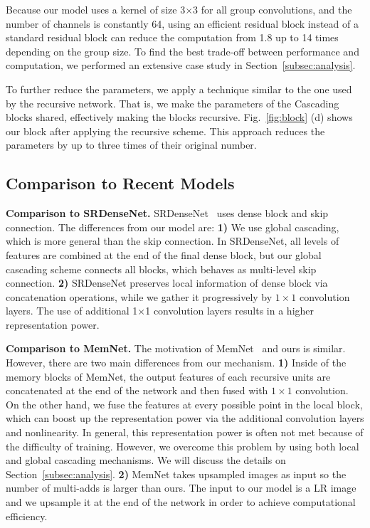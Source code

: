 \documentclass[runningheads]{llncs}
\begin{document}
Because our model uses a kernel of size 3$\times$3 for all group convolutions, and the number of channels is constantly 64, using an efficient residual block instead of a standard residual block can reduce the computation from 1.8 up to 14 times depending on the group size. To find the best trade-off between performance and computation, we performed an extensive case study in Section~\ref{subsec:analysis}.

To further reduce the parameters, we apply a technique similar to the one used by the recursive network. That is, we make the parameters of the Cascading blocks shared, effectively making the blocks recursive. Fig.~\ref{fig:block}  (d) shows our block after applying the recursive scheme. This approach reduces the parameters by up to three times of their original number.

\subsection{Comparison to Recent Models}
\textbf{Comparison to SRDenseNet.} SRDenseNet~\cite{srdense} uses dense block and skip connection. The differences from our model are: \textbf{1)} We use global cascading, which is more general than the skip connection. In SRDenseNet, all levels of features are combined at the end of the final dense block, but our global cascading scheme connects all blocks, which behaves as multi-level skip connection. \textbf{2)} SRDenseNet preserves local information of dense block via concatenation operations, while we gather it progressively by $1\times1$ convolution layers. The use of additional 1$\times$1 convolution layers results in a higher representation power.

\noindent\textbf{Comparison to MemNet.} The motivation of MemNet~\cite{memnet} and ours is similar. However, there are two main differences from our mechanism. \textbf{1)} Inside of the memory blocks of MemNet, the output features of each recursive units are concatenated at the end of the network and then fused with $1\times1$ convolution. On the other hand, we fuse the features at every possible point in the local block, which can boost up the representation power via the additional convolution layers and nonlinearity. In general, this representation power is often not met because of the difficulty of training. However, we overcome this problem by using both local and global cascading mechanisms. We will discuss the details on Section~\ref{subsec:analysis}.
\textbf{2)} MemNet takes upsampled images as input so the number of multi-adds is larger than ours. The input to our model is a LR image and we upsample it at the end of the network in order to achieve computational efficiency.
\end{document}
